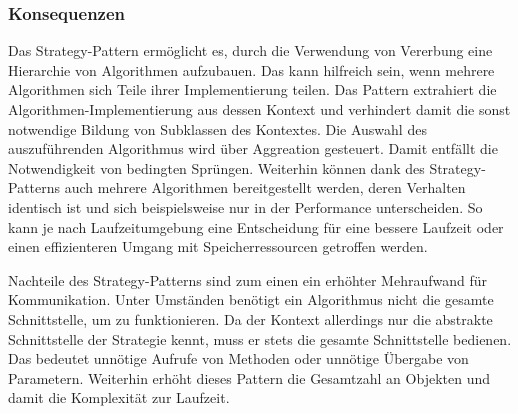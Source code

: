 \subsubsection*{Konsequenzen}
Das Strategy-Pattern ermöglicht es, durch die Verwendung von Vererbung eine Hierarchie von Algorithmen aufzubauen. Das kann hilfreich sein, wenn mehrere Algorithmen sich Teile ihrer Implementierung teilen. Das Pattern extrahiert die Algorithmen-Implementierung aus dessen Kontext und verhindert damit die sonst notwendige Bildung von Subklassen des Kontextes. Die Auswahl des auszuführenden Algorithmus wird über Aggreation gesteuert. Damit entfällt die Notwendigkeit von bedingten Sprüngen. Weiterhin können dank des Strategy-Patterns auch mehrere Algorithmen bereitgestellt werden, deren Verhalten identisch ist und sich beispielsweise nur in der Performance unterscheiden. So kann je nach Laufzeitumgebung eine Entscheidung für eine bessere Laufzeit oder einen effizienteren Umgang mit Speicherressourcen getroffen werden.

Nachteile des Strategy-Patterns sind zum einen ein erhöhter Mehraufwand für Kommunikation. Unter Umständen benötigt ein Algorithmus nicht die gesamte Schnittstelle, um zu funktionieren. Da der Kontext allerdings nur die abstrakte Schnittstelle der Strategie kennt, muss er stets die gesamte Schnittstelle bedienen. Das bedeutet unnötige Aufrufe von Methoden oder unnötige Übergabe von Parametern. Weiterhin erhöht dieses Pattern die Gesamtzahl an Objekten und damit die Komplexität zur Laufzeit. \cite{gamma_design_1995}